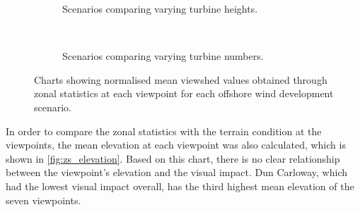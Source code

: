 \begin{figure}
  \centering
  \begin{subfigure}[t]{.9\textwidth}
    \caption*{Scenarios comparing varying turbine heights.}
  \end{subfigure}
  \\[.2cm]
  \begin{subfigure}[t]{.9\textwidth}
    \caption*{Scenarios comparing varying turbine numbers.}
  \end{subfigure}
  \caption{Charts showing normalised mean viewshed values obtained through zonal
  statistics at each viewpoint for each offshore wind development scenario. \label{fig:zs_scenarios}}
\end{figure}

In order to compare the zonal statistics with the terrain condition at the viewpoints, the mean elevation at each viewpoint was also calculated, which is shown in \autoref{fig:zs_elevation}. Based on this chart, there is no clear relationship between the viewpoint's elevation and the visual impact. Dun Carloway, which had the lowest visual impact overall, has the third highest mean elevation of the seven viewpoints.

